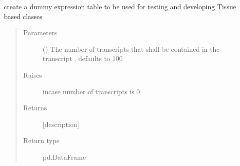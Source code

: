 \documentclass[letterpaper,10pt,english]{sphinxmanual}
\begin{document}

\begin{fulllineitems}
\label{\detokenize{IPTK.Utils:IPTK.Utils.DevFunctions.simulate_an_expression_table}}
create a dummy expression table to be used for testing and developing Tissue based classes
\begin{quote}\begin{description}
\item[{Parameters}] \leavevmode
{} (\sphinxstyleliteralemphasis{\sphinxupquote{, }}) \textendash{} The number of transcripts that shall be contained in the transcript , defaults to 100

\item[{Raises}] \leavevmode
{} \textendash{} incase number of transcripts is 0

\item[{Returns}] \leavevmode
{[}description{]}

\item[{Return type}] \leavevmode
pd.DataFrame

\end{description}\end{quote}

\end{fulllineitems}

\end{document}
